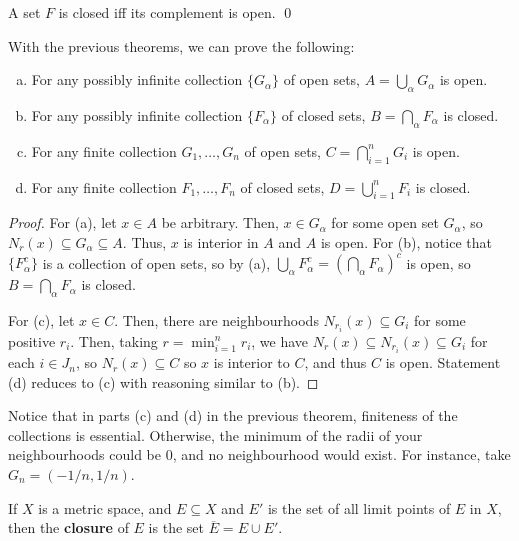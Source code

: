 \begin{corollary}
A set $F$ is closed iff its complement is open. \qed
\end{corollary}

\begin{theorem}
With the previous theorems, we can prove the following:
\begin{enumerate}[(a)]
\item For any possibly infinite collection $\{G_\alpha\}$ of open sets, $A = \bigcup_\alpha G_\alpha$ is open.

\item For any possibly infinite collection $\{F_\alpha\}$ of closed sets, $B = \bigcap_\alpha F_\alpha$ is closed.

\item For any finite collection $G_1, \dotsc, G_n$ of open sets, $C = \bigcap_{i=1}^{n} G_i$ is open.

\item For any finite collection $F_1, \dotsc, F_n$ of closed sets, $D = \bigcup_{i=1}^{n} F_i$ is closed.
\end{enumerate}

\begin{proof}
For (a), let $x \in A$ be arbitrary. Then, $x \in G_\alpha$ for some open set $G_\alpha$, so $N_r(x) \subseteq G_\alpha \subseteq A$. Thus, $x$ is interior in $A$ and $A$ is open. For (b), notice that $\{F_\alpha^c\}$ is a collection of open sets, so by (a), $\bigcup_\alpha F_\alpha^c = \left(\bigcap_\alpha F_\alpha\right)^c$ is open, so $B = \bigcap_\alpha F_\alpha$ is closed.

For (c), let $x \in C$. Then, there are neighbourhoods $N_{r_i}(x) \subseteq G_i$ for some positive $r_i$. Then, taking $r = \min_{i=1}^{n} r_i$, we have $N_r(x) \subseteq N_{r_i}(x) \subseteq G_i$ for each $i \in J_n$, so $N_r(x) \subseteq C$ so $x$ is interior to $C$, and thus $C$ is open. Statement (d) reduces to (c) with reasoning similar to (b).
\end{proof}
\end{theorem}

Notice that in parts (c) and (d) in the previous theorem, finiteness of the collections is essential. Otherwise, the minimum of the radii of your neighbourhoods could be 0, and no neighbourhood would exist. For instance, take $G_n = (-1/n, 1/n)$.

\begin{definition}
If $X$ is a metric space, and $E \subseteq X$ and $E'$ is the set of all limit points of $E$ in $X$, then the \textbf{closure} of $E$ is the set $\overline{E} = E \cup E'$. 
\end{definition}

